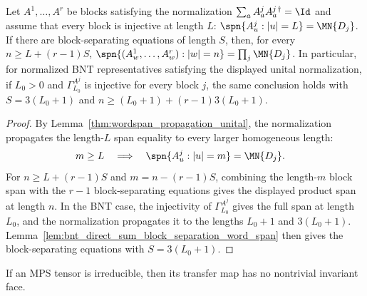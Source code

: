 \begin{lemma}
    \label{lem:unital_block_separating_product_span}
    \leanok
    Let $A^1,\ldots,A^r$ be blocks satisfying the normalization
    $\sum_a A^j_aA^{j\,\dagger}_a=\Id$ and assume that every block is
    injective at length $L$:
    $\spn\{A^j_u:|u|=L\} =\MN{D_j}$.
    If there are block-separating equations of length $S$, then, for every
    $n\ge L+(r-1)S$,
    $\spn\{(A^1_w,\ldots,A^r_w):|w|=n\} = \prod_j \MN{D_j}$.
    In particular, for normalized BNT representatives satisfying the displayed
    unital normalization, if $L_0>0$ and $\Gamma_{L_0}^{A^j}$ is injective for
    every block $j$, the same conclusion holds with
    $S=3(L_0+1)$ and $n\ge (L_0+1)+(r-1)3(L_0+1)$.
\end{lemma}

\begin{proof}
    \leanok
    By Lemma~\ref{thm:wordspan_propagation_unital}, the normalization
    propagates the length-$L$ span equality to every larger homogeneous length:
    \begin{align}
        m\ge L
        \quad\Longrightarrow\quad
        \spn\{A^j_u:|u|=m\}
         & =\MN{D_j}. \notag
    \end{align}
    For $n\ge L+(r-1)S$ and $m=n-(r-1)S$, combining the length-$m$ block
    span with the $r-1$ block-separating equations gives the displayed product
    span at length $n$. In the BNT case, the injectivity of
    $\Gamma_{L_0}^{A^j}$ gives the full span at length $L_0$, and the
    normalization propagates it to the lengths $L_0+1$ and $3(L_0+1)$.
    Lemma~\ref{lem:bnt_direct_sum_block_separation_word_span} then gives the
    block-separating equations with $S=3(L_0+1)$.
\end{proof}

\begin{lemma}
    \label{thm:irreducible_tensor_to_transfer_map}
    \leanok
    If an MPS tensor is irreducible, then its transfer map has no nontrivial
    invariant face.
\end{lemma}


